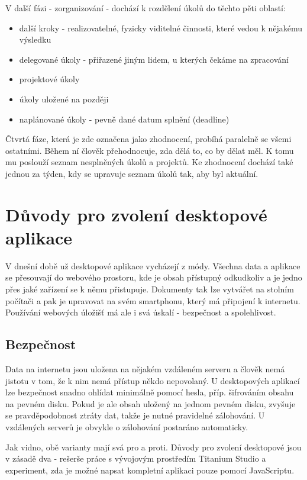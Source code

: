 V další fázi - zorganizování - dochází k rozdělení úkolů do těchto pěti oblastí:

\begin{itemize}
\item další kroky - realizovatelné, fyzicky viditelné činnosti, které vedou k nějakému výsledku
\item delegované úkoly - přiřazené jiným lidem, u kterých čekáme na zpracování
\item projektové úkoly
\item úkoly uložené na později
\item naplánované úkoly - pevně dané datum splnění (deadline)
\end{itemize}

Čtvrtá fáze, která je zde označena jako zhodnocení, probíhá paralelně se všemi ostatními. Během ní člověk přehodnocuje, zda dělá to, co by dělat měl. K tomu mu poslouží seznam nesplněných úkolů a projektů. Ke zhodnocení dochází také jednou za týden, kdy se upravuje seznam úkolů tak, aby byl aktuální.

\section{Důvody pro zvolení desktopové aplikace}

V dnešní době už desktopové aplikace vycházejí z módy. Všechna data a aplikace se přesouvají do webového prostoru, kde je obsah přístupný odkudkoliv a je jedno přes jaké zařízení se k němu přistupuje. Dokumenty tak lze vytvářet na stolním počítači a pak je upravovat na svém smartphonu, který má připojení k internetu. Používání webových úložišť má ale i svá úskalí - bezpečnost a spolehlivost.

\subsection{Bezpečnost}

Data na internetu jsou uložena na nějakém vzdáleném serveru a člověk nemá jistotu v tom, že k nim nemá přístup někdo nepovolaný. U desktopových aplikací lze bezpečnost snadno ohlídat minimálně pomocí hesla, příp. šifrováním obsahu na pevném disku. Pokud je ale obsah uložený na jednom pevném disku, zvyšuje se pravděpodobnost ztráty dat, takže je nutné pravidelné zálohování. U vzdálených serverů je obvykle o zálohování postaráno automaticky.

Jak vidno, obě varianty mají svá pro a proti. Důvody pro zvolení desktopové jsou v zásadě dva - rešerše práce s vývojovým prostředím Titanium Studio a experiment, zda je možné napsat kompletní aplikaci pouze pomocí JavaScriptu. 

